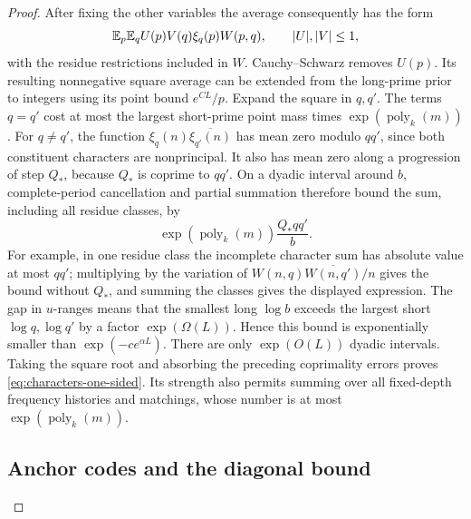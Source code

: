 \begin{proof}
After fixing the other variables the average consequently
has the form
\[
 \mathbb E_p\mathbb E_q U(p)V(q)\xi_q(p)W(p,q),
 \qquad |U|,|V|\le1,
\]
with the residue restrictions included in \(W\).
Cauchy--Schwarz removes \(U(p)\). Its resulting nonnegative
square average can be extended from the long-prime prior
to integers using its point bound \(e^{CL}/p\).
Expand the square in \(q,q'\).
The terms \(q=q'\) cost at most the largest short-prime
point mass times \(\exp(\operatorname{poly}_k(m))\).
For \(q\ne q'\), the function
\(\xi_q(n)\overline{\xi_{q'}(n)}\) has mean zero modulo
\(qq'\), since both constituent characters are nonprincipal.
It also has mean zero along a progression of step \(Q_*\),
because \(Q_*\) is coprime to \(qq'\).
On a dyadic interval around \(b\), complete-period
cancellation and partial summation therefore bound the sum,
including all residue classes, by
\[
 \exp(\operatorname{poly}_k(m))\frac{Q_*qq'}{b}.
\]
For example, in one residue class the incomplete character
sum has absolute value at most \(qq'\); multiplying by
the variation of \(W(n,q)\overline{W(n,q')}/n\) gives
the bound without \(Q_*\), and summing the classes gives
the displayed expression.
The gap in \(u\)-ranges means that the smallest long
\(\log b\) exceeds the largest short \(\log q,\log q'\)
by a factor \(\exp(\Omega(L))\). Hence this bound is
exponentially smaller than \(\exp(-c e^{\alpha L})\).
There are only \(\exp(O(L))\) dyadic intervals.
Taking the square root and absorbing the preceding
coprimality errors proves \eqref{eq:characters-one-sided}.
Its strength also permits summing over all fixed-depth
frequency histories and matchings, whose number is at most
\(\exp(\operatorname{poly}_k(m))\).

\subsection*{Anchor codes and the diagonal bound}


\end{proof}
